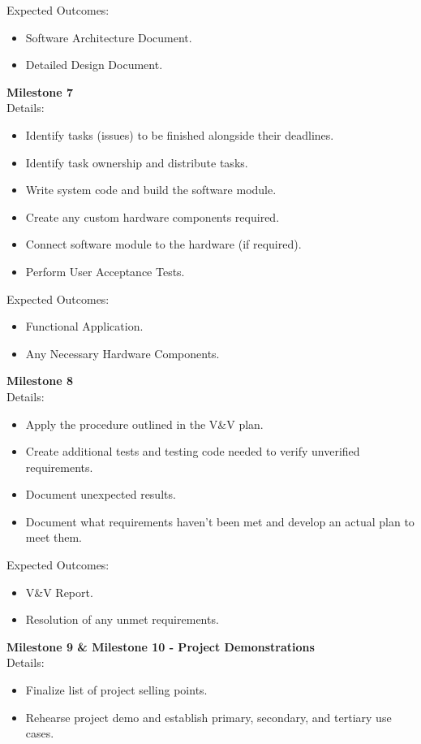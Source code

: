 \documentclass{scrreprt}
\theoremstyle{definition}
\begin{document}
Expected Outcomes:
\begin{itemize}
\item Software Architecture Document.
\item Detailed Design Document.
\end{itemize}
\textbf{Milestone 7}\\
Details:
\begin{itemize}
\item Identify tasks (issues) to be finished alongside their deadlines.
\item Identify task ownership and distribute tasks.
\item Write system code and build the software module.
\item Create any custom hardware components required.
\item Connect software module to the hardware (if required).
\item Perform User Acceptance Tests.
\end{itemize}
Expected Outcomes:
\begin{itemize}
\item Functional Application.
\item Any Necessary Hardware Components.
\end{itemize}
\textbf{Milestone 8}\\
Details:
\begin{itemize}
\item Apply the procedure outlined in the V\&V plan.
\item Create additional tests and testing code needed to verify unverified requirements.
\item Document unexpected results.
\item Document what requirements haven't been met and develop an actual plan to meet them.
\end{itemize}
Expected Outcomes:
\begin{itemize}
\item V\&V Report.
\item Resolution of any unmet requirements.
\end{itemize}
\textbf{Milestone 9 \& Milestone 10 - Project Demonstrations}\\
Details:
\begin{itemize}
\item Finalize list of project selling points.
\item Rehearse project demo and establish primary, secondary, and tertiary use cases.
\end{itemize}
\end{document}
